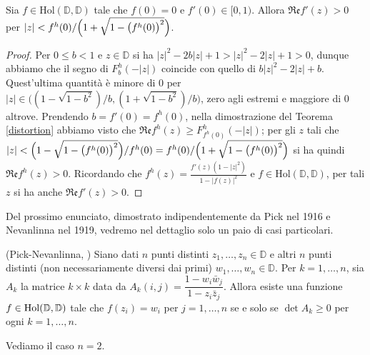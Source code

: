 \begin{cor} \label{distorto}
  Sia $f \in \text{Hol}(\mathbb{D},\mathbb{D})$ tale che $f(0)=0$ e $f'(0) \in [0,1)$. Allora $\mathfrak{Re}f'(z)>0$ per $|z|<f^h(0)/\Bigl(1+\sqrt{1-\bigl(f^h(0)\bigr)^2}\Bigr)$.
\end{cor}

\begin{proof}
  Per $0 \le b<1$ e $z \in \mathbb{D}$ si ha $|z|^2-2b|z|+1>|z|^2-2|z|+1>0$, dunque abbiamo che il segno di $F_b^h(-|z|)$ coincide con quello di $b|z|^2-2|z|+b$. Quest'ultima quantità è minore di $0$ per $|z| \in \bigl((1-\sqrt{1-b^2})/b, (1+\sqrt{1-b^2})/b\bigr)$, zero agli estremi e maggiore di $0$ altrove.
  Prendendo $b=f'(0)=f^h(0)$, nella dimostrazione del Teorema \ref{distortion} abbiamo visto che $\mathfrak{Re}f^h(z) \ge F_{f^h(0)}^h(-|z|)$; per gli $z$ tali che $|z|<\Bigl(1-\sqrt{1-\bigl(f^h(0)\bigr)^2}\Bigr)/f^h(0)=f^h(0)/\Bigl(1+\sqrt{1-\bigl(f^h(0)\bigr)^2}\Bigr)$ si ha quindi $\mathfrak{Re}f^h(z)>0$.
  Ricordando che $f^h(z)=\frac{f'(z)(1-|z|^2)}{1-|f(z)|^2}$ e $f \in \text{Hol}(\mathbb{D},\mathbb{D})$, per tali $z$ si ha anche $\mathfrak{Re}f'(z)>0$.
\end{proof}

Del prossimo enunciato, dimostrato indipendentemente da Pick nel 1916 e Nevanlinna nel 1919, vedremo nel dettaglio solo un paio di casi particolari.

\begin{thm}
  (Pick-Nevanlinna, \cite[Chapter 1, Theorem 2.2]{JBG}) Siano dati $n$ punti distinti $z_1, \dots, z_n \in \mathbb{D}$ e altri $n$ punti distinti (non necessariamente diversi dai primi) $w_1, \dots, w_n \in \mathbb{D}$. Per $k=1, \dots, n$, sia $A_k$ la matrice $k \times k$ data da $A_k(i,j)=\dfrac{1-w_i\bar{w}_j}{1-z_i\bar{z}_j}$.
  Allora esiste una funzione $f \in \normalfont{\text{Hol}}(\mathbb{D},\mathbb{D})$ tale che $f(z_i)=w_i$ per $j=1, \dots, n$ se e solo se $\det{A_k} \ge 0$ per ogni $k=1, \dots, n$.
\end{thm}

Vediamo il caso $n=2$.

